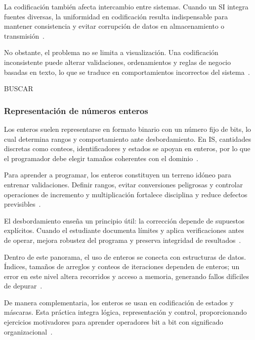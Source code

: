 \documentclass[12pt,twoside]{book}
\begin{document}
						La codificación también afecta intercambio entre sistemas. Cuando un SI integra fuentes diversas, la uniformidad en codificación resulta indispensable para mantener consistencia y evitar corrupción de datos en almacenamiento o transmisión~\cite{Date2019Database,Elmasri2016Database,Laudon2020Management}.
						
						No obstante, el problema no se limita a visualización. Una codificación inconsistente puede alterar validaciones, ordenamientos y reglas de negocio basadas en texto, lo que se traduce en comportamientos incorrectos del sistema~\cite{Kendall2014Systems,ISO247722024Programming,Ghezzi2003Fundamentals}.
						
						BUSCAR
						
					\subsubsection{Representación de números enteros}
						\noindent
						Los enteros suelen representarse en formato binario con un número fijo de bits, lo cual determina rangos y comportamiento ante desbordamiento. En IS, cantidades discretas como conteos, identificadores y estados se apoyan en enteros, por lo que el programador debe elegir tamaños coherentes con el dominio~\cite{Tanenbaum2021Structured,Gaddis2022Starting,Hanly2015Problem}.
						
						Para aprender a programar, los enteros constituyen un terreno idóneo para entrenar validaciones. Definir rangos, evitar conversiones peligrosas y controlar operaciones de incremento y multiplicación fortalece disciplina y reduce defectos previsibles~\cite{ISO247722024Programming,Ghezzi2003Fundamentals,Pressman2019Software}.
						
						El desbordamiento enseña un principio útil: la corrección depende de supuestos explícitos. Cuando el estudiante documenta límites y aplica verificaciones antes de operar, mejora robustez del programa y preserva integridad de resultados~\cite{Sommerville2015Software,Hanly2015Problem,ISO247722024Programming}.
						
						Dentro de este panorama, el uso de enteros se conecta con estructuras de datos. Índices, tamaños de arreglos y conteos de iteraciones dependen de enteros; un error en este nivel altera recorridos y acceso a memoria, generando fallos difíciles de depurar~\cite{Wirth1976Algorithms,Sedgewick2011Algorithms,Gaddis2022Starting}.
						
						De manera complementaria, los enteros se usan en codificación de estados y máscaras. Esta práctica integra lógica, representación y control, proporcionando ejercicios motivadores para aprender operadores bit a bit con significado organizacional~\cite{Manzano2017Programacion,Wirth1976Algorithms,Laudon2020Management}.
						
\end{document}
